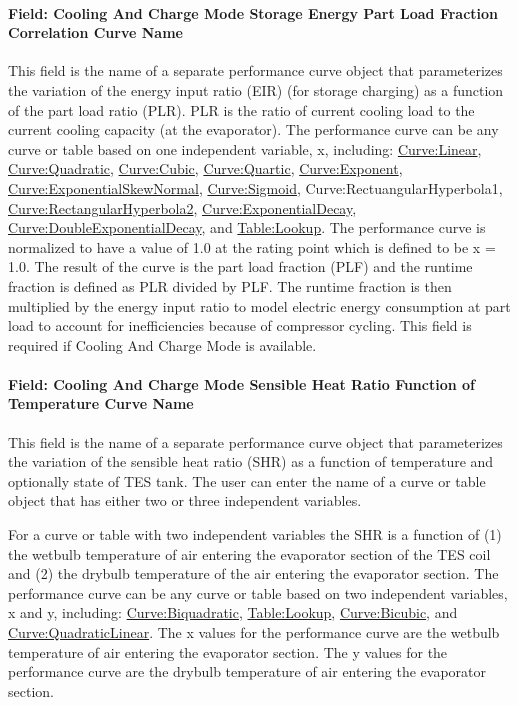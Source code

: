 \paragraph{Field: Cooling And Charge Mode Storage Energy Part Load Fraction Correlation Curve Name}\label{field-cooling-and-charge-mode-storage-energy-part-load-fraction-correlation-curve-name}

This field is the name of a separate performance curve object that parameterizes the variation of the energy input ratio (EIR) (for storage charging) as a function of the part load ratio (PLR). PLR is the ratio of current cooling load to the current cooling capacity (at the evaporator). The performance curve can be any curve or table based on one independent variable, x, including: \hyperref[curvelinear]{Curve:Linear}, \hyperref[curvequadratic]{Curve:Quadratic}, \hyperref[curvecubic]{Curve:Cubic}, \hyperref[curvequartic]{Curve:Quartic}, \hyperref[curveexponent]{Curve:Exponent}, \hyperref[curveexponentialskewnormal]{Curve:ExponentialSkewNormal}, \hyperref[curvesigmoid]{Curve:Sigmoid}, Curve:RectuangularHyperbola1, \hyperref[curverectangularhyperbola2]{Curve:RectangularHyperbola2}, \hyperref[curveexponentialdecay]{Curve:ExponentialDecay}, \hyperref[curvedoubleexponentialdecay]{Curve:DoubleExponentialDecay}, and \hyperref[tablelookup]{Table:Lookup}. The performance curve is normalized to have a value of 1.0 at the rating point which is defined to be x = 1.0. The result of the curve is the part load fraction (PLF) and the runtime fraction is defined as PLR divided by PLF. The runtime fraction is then multiplied by the energy input ratio to model electric energy consumption at part load to account for inefficiencies because of compressor cycling. This field is required if Cooling And Charge Mode is available.

\paragraph{Field: Cooling And Charge Mode Sensible Heat Ratio Function of Temperature Curve Name}\label{field-cooling-and-charge-mode-sensible-heat-ratio-function-of-temperature-curve-name}

This field is the name of a separate performance curve object that parameterizes the variation of the sensible heat ratio (SHR) as a function of temperature and optionally state of TES tank. The user can enter the name of a curve or table object that has either two or three independent variables.

For a curve or table with two independent variables the SHR is a function of (1) the wetbulb temperature of air entering the evaporator section of the TES coil and (2) the drybulb temperature of the air entering the evaporator section. The performance curve can be any curve or table based on two independent variables, x and y, including: \hyperref[curvebiquadratic]{Curve:Biquadratic}, \hyperref[tablelookup]{Table:Lookup}, \hyperref[curvebicubic]{Curve:Bicubic}, and \hyperref[curvequadraticlinear]{Curve:QuadraticLinear}. The x values for the performance curve are the wetbulb temperature of air entering the evaporator section. The y values for the performance curve are the drybulb temperature of air entering the evaporator section.


